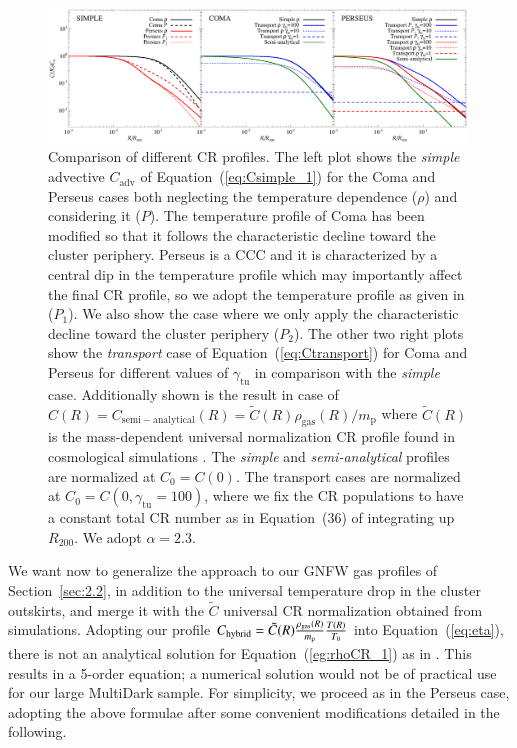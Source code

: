 \documentclass[traditabstract]{aa}
\newcommand{\rmn}{\mathrm}
\begin{document}
\begin{appendix}
\begin{figure}[t!]
\centering
\includegraphics[width=0.99\textwidth]{figures/CR_profiles_simple_comparison.eps}
\caption{Comparison of different CR profiles. The left plot shows the \emph{simple} advective $C_{\rmn{adv}}$ of Equation~(\ref{eq:Csimple_1}) for the Coma and Perseus cases both neglecting the temperature dependence ($\rho$) and considering it ($P$). The temperature profile of Coma has been modified so that it follows the characteristic decline toward the cluster periphery. Perseus is a CCC and it is characterized by a central dip in the temperature profile which may importantly affect the final CR profile, so we adopt the temperature profile as given in \cite{2003ApJ...590..225C} ($P_{1}$). We also show the case where we only apply the characteristic decline toward the cluster periphery ($P_{2}$). The other two right plots show the \emph{transport} case of Equation~(\ref{eq:Ctransport}) for Coma and Perseus for different values of $\gamma_{\rmn{tu}}$ in comparison with the \emph{simple} case. Additionally shown is the result in case of $C(R)=C_{\rmn{semi-analytical}}(R)=\tilde{C}(R)\rho_{\rmn{gas}}(R)/m_{\rmn{p}}$ where $\tilde{C}(R)$ is the mass-dependent universal normalization CR profile found in cosmological simulations \citep{2010MNRAS.409..449P}. The \emph{simple} and \emph{semi-analytical} profiles are normalized at $C_{0}=C(0)$. The transport cases are normalized at $C_{0}=C(0,\gamma_{\rmn{tu}}=100)$, where we fix the CR populations to have a constant total CR number as in Equation~(36) of \cite{2011A&A...527A..99E} integrating up $R_{200}$. We adopt $\alpha=2.3$.}
\label{fig:simpleVStransport}
\end{figure}

We want now to generalize the \cite{2011A&A...527A..99E} approach to our GNFW 
gas profiles of Section~\ref{sec:2.2}, in addition to the universal temperature drop in
the cluster outskirts, and merge it with the $\tilde{C}$ universal CR normalization 
obtained from simulations. Adopting our profile 
$C_{\rm{hybrid}} = \tilde{C}(R) \frac{\rho_{\rmn{gas}}(R)}{m_\rmn{p}} \frac{T(R)}{T_0} $
into Equation~(\ref{eq:eta}), there is not an analytical solution for Equation~(\ref{eg:rhoCR_1}) 
as in \cite{2011A&A...527A..99E}. This results in a 5-order equation; a numerical 
solution would not be of practical use for our large MultiDark sample. For simplicity, we 
proceed as in the Perseus case, adopting the above formulae after some convenient 
modifications detailed in the following. 


\end{appendix}
\end{document}
